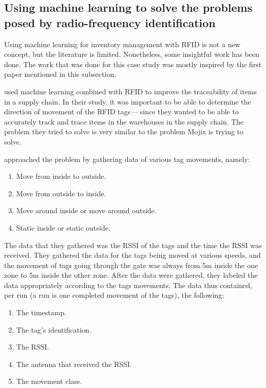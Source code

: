 \documentclass{article}
\begin{document}
\subsection{Using machine learning to solve the problems posed by radio-frequency identification}
Using machine learning for inventory management with \ac{RFID} is not a new concept, but the literature is limited.
Nonetheless, some insightful work has been done.
The work that was done for this case study was mostly inspired by the first paper mentioned in this subsection.

\citet{ref:Alfian} used machine learning combined with \ac{RFID} to improve the traceability of items in a supply chain.
In their study, it was important to be able to determine the direction of movement of the \ac{RFID} tags\,---\,since they wanted to be able to accurately track and trace items in the warehouses in the supply chain.
The problem they tried to solve is very similar to the problem Mojix is trying to solve.

\citet{ref:Alfian} approached the problem by gathering data of various tag movements, namely:
\begin{enumerate}
    \item Move from inside to outside.
    \item Move from outside to inside.
    \item Move around inside or move around outside.
    \item Static inside or static outside.
\end{enumerate}
The data that they gathered was the \ac{RSSI} of the tags and the time the \ac{RSSI} was received.
They gathered the data for the tags being moved at various speeds, and the movement of tags going through the gate was always from 5m inside the one zone to 5m inside the other zone.
After the data were gathered, they labeled the data appropriately according to the tags movements.
The data thus contained, per run (a run is one completed movement of the tags), the following:
\begin{enumerate}
    \item The timestamp.
    \item The tag's identification.
    \item The \ac{RSSI}.
    \item The antenna that received the \ac{RSSI}.
    \item The movement class.
\end{enumerate}
\end{document}
